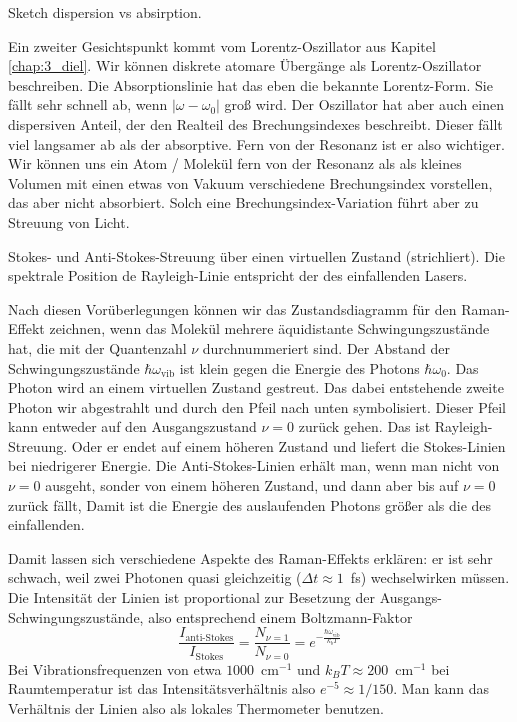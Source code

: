 \begin{marginfigure}
\caption{Sketch dispersion vs absirption.}
\end{marginfigure}
 

Ein zweiter Gesichtspunkt kommt vom Lorentz-Oszillator aus Kapitel \ref{chap:3_diel}. Wir können diskrete atomare Übergänge als Lorentz-Oszillator beschreiben. Die Absorptionslinie hat das eben die bekannte Lorentz-Form. Sie fällt sehr schnell ab, wenn $| \omega  - \omega_0 |$ groß wird. Der Oszillator hat aber auch einen dispersiven Anteil, der den Realteil des Brechungsindexes beschreibt. Dieser fällt viel langsamer ab als der absorptive. Fern von der Resonanz ist er also wichtiger. Wir können uns ein Atom / Molekül fern von der Resonanz als als kleines Volumen mit einen etwas von Vakuum verschiedene Brechungsindex vorstellen, das aber nicht absorbiert. Solch eine Brechungsindex-Variation führt aber zu Streuung von Licht.

\begin{marginfigure}%
\caption{Stokes- und Anti-Stokes-Streuung über einen virtuellen Zustand (strichliert). Die spektrale Position de Rayleigh-Linie entspricht der des einfallenden Lasers.}
\end{marginfigure}
 

Nach diesen Vorüberlegungen können wir das Zustandsdiagramm für den Raman-Effekt zeichnen, wenn das Molekül mehrere äquidistante Schwingungszustände hat, die mit der Quantenzahl $\nu$ durchnummeriert sind. Der Abstand der Schwingungszustände $\hbar \omega_\text{vib}$ ist klein gegen die Energie des Photons $\hbar \omega_0$. Das Photon wird an einem virtuellen Zustand gestreut. Das dabei entstehende zweite Photon wir abgestrahlt und durch den Pfeil nach unten symbolisiert. Dieser Pfeil kann entweder auf den Ausgangszustand $\nu = 0$ zurück gehen. Das ist Rayleigh-Streuung. Oder er endet auf einem höheren Zustand und liefert die Stokes-Linien bei niedrigerer Energie. Die Anti-Stokes-Linien erhält man, wenn man nicht von $\nu = 0$ ausgeht, sonder von einem höheren Zustand, und dann aber bis auf $\nu = 0$ zurück fällt, Damit ist die Energie des auslaufenden Photons größer als die des einfallenden.



Damit lassen sich verschiedene Aspekte des Raman-Effekts erklären: er ist sehr schwach, weil zwei Photonen quasi gleichzeitig ($\Delta t \approx 1$~fs) wechselwirken müssen. Die Intensität der Linien ist proportional zur Besetzung der Ausgangs-Schwingungszustände, also entsprechend einem Boltzmann-Faktor
\begin{equation}
\frac{I_\text{anti-Stokes}}{I_\text{Stokes}} = 
\frac{N_{\nu = 1}}{N_{\nu = 0}} =
 e^{- \frac{\hbar \omega_\text{vib}}{k_b T}}
\end{equation}
Bei Vibrationsfrequenzen von etwa $1000$~cm$^{-1}$ und $k_B T \approx 200 $~cm$^{-1}$ bei Raumtemperatur ist das Intensitätsverhältnis also $e^{-5} \approx 1 /150$. Man kann das Verhältnis der Linien also als lokales Thermometer benutzen.

